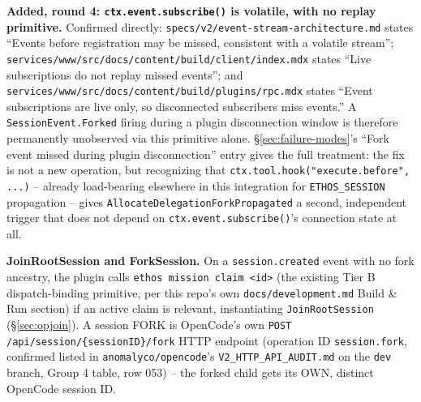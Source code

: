 \documentclass[a4paper,10pt,fleqn]{article}
\newcommand{\fpath}[1]{\texttt{#1}}
\newcommand{\field}[1]{\texttt{#1}}
\begin{document}
\textbf{Added, round 4: \field{ctx.event.subscribe()} is volatile, with
no replay primitive.} Confirmed directly:
\fpath{specs/v2/event-stream-architecture.md} states ``Events before
registration may be missed, consistent with a volatile stream'';
\fpath{services/www/src/docs/content/build/client/index.mdx} states
``Live subscriptions do not replay missed events''; and
\fpath{services/www/src/docs/content/build/plugins/rpc.mdx} states
``Event subscriptions are live only, so disconnected subscribers miss
events.'' A \field{SessionEvent.Forked} firing during a plugin
disconnection window is therefore permanently unobserved via this
primitive alone. \S\ref{sec:failure-modes}'s ``Fork event missed during
plugin disconnection'' entry gives the full treatment: the fix is not a
new operation, but recognizing that \field{ctx.tool.hook("execute.before", ...)}
-- already load-bearing elsewhere in this integration for
\field{ETHOS\_SESSION} propagation -- gives \field{AllocateDelegationForkPropagated}
a second, independent trigger that does not depend on
\field{ctx.event.subscribe()}'s connection state at all.

\textbf{JoinRootSession and ForkSession.} On a \field{session.created}
event with no fork ancestry, the plugin calls \field{ethos mission
claim <id>} (the existing Tier B dispatch-binding primitive, per this
repo's own \fpath{docs/development.md} Build \& Run section) if an
active claim is relevant, instantiating \field{JoinRootSession}
(\S\ref{sec:opjoin}). A session FORK is OpenCode's own
\field{POST /api/session/\{sessionID\}/fork} HTTP endpoint (operation ID
\field{session.fork}, confirmed listed in
\fpath{anomalyco/opencode}'s \fpath{V2\_HTTP\_API\_AUDIT.md} on the
\field{dev} branch, Group 4 table, row 053) -- the forked child gets its
OWN, distinct OpenCode session ID.
\end{document}

